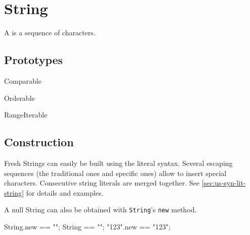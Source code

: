 
\section{String}

A  is a sequence of characters.

\subsection{Prototypes}
\begin{refObjects}
\item[Comparable]
\item[Orderable]
\item[RangeIterable]
\end{refObjects}

\subsection{Construction}
Fresh Strings can easily be built using the literal syntax.  Several
escaping sequences (the traditional ones and \us specific ones) allow
to insert special characters.  Consecutive string literals are merged
together.  See \autoref{sec:us-syn-lit-string} for details and
examples.

A null String can also be obtained with \lstinline|String|'s
\lstinline|new| method.

\begin{urbiassert}[firstnumber=1]
String.new == "";
String == "";
"123".new == "123";
\end{urbiassert}

